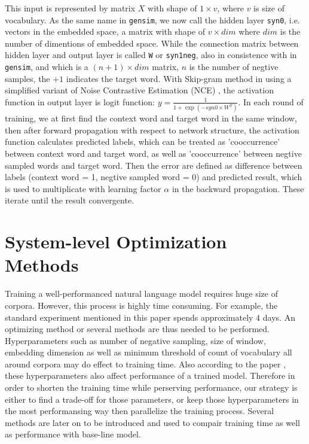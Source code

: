 \documentclass[11pt,a4paper]{article}
\begin{document}
This input is represented by matrix $X$ with shape of $1\times v$, where $v$ is size of vocabulary. As the same name in \verb|gensim|, we now call the hidden layer \verb|syn0|, i.e. vectors in the embedded space, a matrix with shape of $v\times dim$ where $dim$ is the number of dimentions of embedded space. While the connection matrix between hidden layer and output layer is called \verb|W| or \verb|syn1neg|, also in consistence with in \verb|gensim|, and which is a $(n+1)\times dim$ matrix, $n$ is the number of negtive samples, the $+1$ indicates the target word. With Skip-gram method in \cite{mikolov2013distributed} using a simplified variant of Noise Contrastive Estimation (NCE) \cite{gutmann2012noise}, the activation function in output layer is logit function: $y=\frac{1}{1+\exp(-syn0\times W^T)}$. In each round of training, we at first find the context word and target word in the same window, then after forward propagation with respect to network structure, the activation function calculates predicted labels, which can be treated as 'cooccurrence' between context word and target word, as well as 'cooccurrence' between negtive sampled words and target word. Then the error are defined as difference between labels (context word = 1, negtive sampled word = 0) and predicted result, which is used to multiplicate with learning factor $\alpha$ in the backward propagation. These iterate until the result convergente.

\section{System-level Optimization Methods}
Training a well-performanced natural language model requires huge size of corpora. However, this process is highly time consuming. For example, the standard experiment mentioned in this paper spends approximately 4 days. An optimizing method or several methods are thus needed to be performed. Hyperparameters such as number of negative sampling, size of window, embedding dimension as well as minimum threshold of count of vocabulary all around corpora may do effect to training time. Also according to the paper \cite{levy2015improving}, these hyperparameters also affect performance of a trained model. Therefore in order to shorten the training time while perserving performance, our strategy is either to find a trade-off for those parameters, or keep those hyperparameters in the most performansing way then parallelize the training process. Several methods are later on to be introduced and used to compair training time as well as performance with base-line model.
\end{document}
